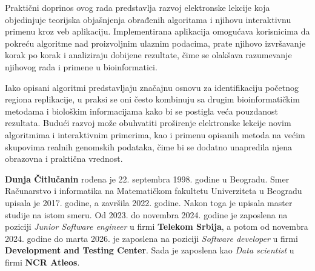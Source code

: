 \documentclass[12pt,oneside]{memoir}
\begin{document}
Praktični doprinos ovog rada predstavlja razvoj elektronske lekcije koja objedinjuje teorijska objašnjenja obrađenih algoritama i njihovu interaktivnu primenu kroz veb aplikaciju. Implementirana aplikacija omogućava korisnicima da pokreću algoritme nad proizvoljnim ulaznim podacima, prate njihovo izvršavanje korak po korak i analiziraju dobijene rezultate, čime se olakšava razumevanje njihovog rada i primene u bioinformatici.

Iako opisani algoritmi predstavljaju značajnu osnovu za identifikaciju početnog regiona replikacije, u praksi se oni često kombinuju sa drugim bioinformatičkim metodama i biološkim informacijama kako bi se postigla veća pouzdanost rezultata. Budući razvoj može obuhvatiti proširenje elektronske lekcije novim algoritmima i interaktivnim primerima, kao i primenu opisanih metoda na većim skupovima realnih genomskih podataka, čime bi se dodatno unapredila njena obrazovna i praktična vrednost.
\literatura

\backmatter

\begin{biografija}
  \textbf{Dunja Čitlučanin} rođena je 22. septembra 1998. godine u Beogradu. Smer Računarstvo i informatika na Matematičkom fakultetu Univerziteta u Beogradu upisala je 2017. godine, a završila 2022. godine. Nakon toga je upisala master studije na istom smeru. 
  Od 2023. do novembra 2024. godine je zaposlena na poziciji \emph{Junior Software engineer}  u firmi \textbf{Telekom Srbija}, a potom od novembra 2024. godine do marta 2026. je zaposlena na poziciji \emph{Software developer} u firmi \textbf{Development and Testing Center}. Sada je zaposlena kao \emph{Data scientist} u firmi \textbf{NCR Atleos}. 
\end{biografija}
\end{document}
